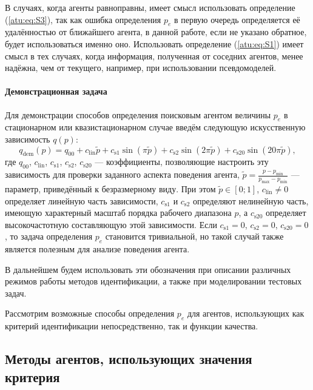 В случаях, когда агенты равноправны, имеет смысл использовать определение (\ref{atu:eq:S3}),
так как ошибка определения $p_e$ в первую очередь определяется
её удалённостью от ближайшего агента, в данной работе, если не указано обратное,
будет использоваться именно оно. Использовать определение (\ref{atu:eq:S1}) имеет смысл в тех случаях,
когда информация, полученная от соседних агентов, менее надёжна, чем от текущего,
например, при использовании псевдомоделей.




\paragraph{Демонстрационная задача}

Для демонстрации способов определения поисковым агентом
величины $p_e$ в стационарном или квазистационарном случае
введём следующую искусственную зависимость $q(p)$:
%
\begin{equation}
  q_\mathrm{dem}(p) = q_{00} + c_\mathrm{lin} \tilde{p} + c_\mathrm{s1} \sin( \pi \tilde{p} ) + c_\mathrm{s2} \sin( 2 \pi \tilde{p} ) + c_\mathrm{s20} \sin( 20 \pi \tilde{p} ),
  \label{atu:eq:q_dem}
\end{equation}
%
где $q_{00}$, $c_\mathrm{lin}$, $c_\mathrm{s1}$, $c_\mathrm{s2}$, $c_\mathrm{s20}$
--- коэффициенты, позволяющие
настроить эту зависимость для проверки заданного аспекта поведения агента,
$ \tilde{p} = \frac{p - p_{\min}}{p_{\max} - p_{\min}} $ --- параметр, приведённый к безразмерному виду.
При этом $\tilde{p} \in[0;1]$, $c_\mathrm{lin} \ne 0$ определяет линейную часть зависимости,
$c_\mathrm{s1}$ и $c_\mathrm{s2}$ определяют нелинейную часть, имеющую характерный масштаб
порядка рабочего диапазона $p$,
а $c_\mathrm{s20}$ определяет высокочастотную составляющую этой зависимости.
Если $c_\mathrm{s1} = 0$, $c_\mathrm{s2}=0$, $c_\mathrm{s20}=0$,
то задача определения $p_e$ становится тривиальной,
но такой случай также является полезным для анализе поведения агента.

В дальнейшем будем использовать эти обозначения при описании
различных режимов работы методов идентификации, а также
при моделировании тестовых задач.

Рассмотрим возможные способы определения $p_e$ для агентов,
использующих как критерий идентификации непосредственно,
так и функции качества.




\subsection{Методы агентов, использующих значения критерия }  %

